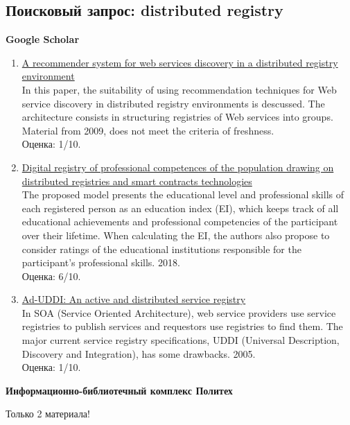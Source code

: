 \documentclass[a4paper, 12pt]{report}		%
\begin{document}
\subsection*{Поисковый запрос: distributed registry}

\textbf{Google Scholar}

\begin{enumerate}
\item \href{https://ieeexplore.ieee.org/abstract/document/5072554}{A recommender system for web services discovery in a distributed registry environment}\\
In this paper, the suitability of using recommendation techniques for Web service discovery in distributed registry environments is descussed. The architecture consists in structuring registries of Web services into groups. Material from 2009, does not meet the criteria of freshness.\\
Оценка: 1/10.
\item \href{https://elibrary.ru/item.asp?id=44086179}{Digital registry of professional competences of the population drawing on distributed registries and smart contracts technologies}\\
The proposed model presents the educational level and professional skills of each registered person as an education index (EI), which keeps track of all educational achievements and professional competencies of the participant over their lifetime. When calculating the EI, the authors also propose to consider ratings of the educational institutions responsible for the participant’s professional skills. 2018.\\
Оценка: 6/10.
\item \href{https://cyberleninka.ru/article/n/tehnologii-raspredelyonnogo-reestra-i-zaschita-dokumentooborota-sudebnoy-sistemy}{Ad-UDDI: An active and distributed service registry}\\
In SOA (Service Oriented Architecture), web service providers use service registries to publish services and requestors use registries to find them. The major current service registry specifications, UDDI (Universal Description, Discovery and Integration), has  some drawbacks. 2005.\\
Оценка: 1/10.
\end{enumerate}

\textbf{Информационно-библиотечный комплекс Политех}

Только 2 материала!
\end{document}
